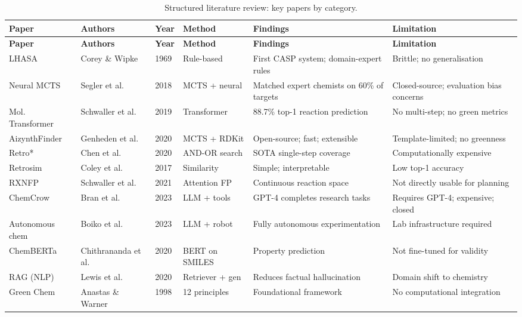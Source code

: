 \documentclass[12pt,a4paper]{article}
\begin{document}
\begin{longtable}{p{3.2cm}p{2.5cm}p{0.7cm}p{2.5cm}p{3.5cm}p{2.8cm}}
  \caption{Structured literature review: key papers by category.}
  \label{tab:litreview} \\
  \toprule
  \textbf{Paper} & \textbf{Authors} & \textbf{Year} & \textbf{Method} & \textbf{Findings} & \textbf{Limitation} \\
  \midrule
  \endfirsthead
  \toprule
  \textbf{Paper} & \textbf{Authors} & \textbf{Year} & \textbf{Method} & \textbf{Findings} & \textbf{Limitation} \\
  \midrule
  \endhead
  \bottomrule
  \endfoot
  LHASA & Corey \& Wipke & 1969 & Rule-based & First CASP system; domain-expert rules & Brittle; no generalisation \\
  \midrule
  Neural MCTS & Segler et al. & 2018 & MCTS + neural & Matched expert chemists on 60\% of targets & Closed-source; evaluation bias concerns \\
  \midrule
  Mol. Transformer & Schwaller et al. & 2019 & Transformer & 88.7\% top-1 reaction prediction & No multi-step; no green metrics \\
  \midrule
  AizynthFinder & Genheden et al. & 2020 & MCTS + RDKit & Open-source; fast; extensible & Template-limited; no greenness \\
  \midrule
  Retro* & Chen et al. & 2020 & AND-OR search & SOTA single-step coverage & Computationally expensive \\
  \midrule
  Retrosim & Coley et al. & 2017 & Similarity & Simple; interpretable & Low top-1 accuracy \\
  \midrule
  RXNFP & Schwaller et al. & 2021 & Attention FP & Continuous reaction space & Not directly usable for planning \\
  \midrule
  ChemCrow & Bran et al. & 2023 & LLM + tools & GPT-4 completes research tasks & Requires GPT-4; expensive; closed \\
  \midrule
  Autonomous chem & Boiko et al. & 2023 & LLM + robot & Fully autonomous experimentation & Lab infrastructure required \\
  \midrule
  ChemBERTa & Chithrananda et al. & 2020 & BERT on SMILES & Property prediction & Not fine-tuned for validity \\
  \midrule
  RAG (NLP) & Lewis et al. & 2020 & Retriever + gen & Reduces factual hallucination & Domain shift to chemistry \\
  \midrule
  Green Chem & Anastas \& Warner & 1998 & 12 principles & Foundational framework & No computational integration \\

\end{longtable}
\end{document}
